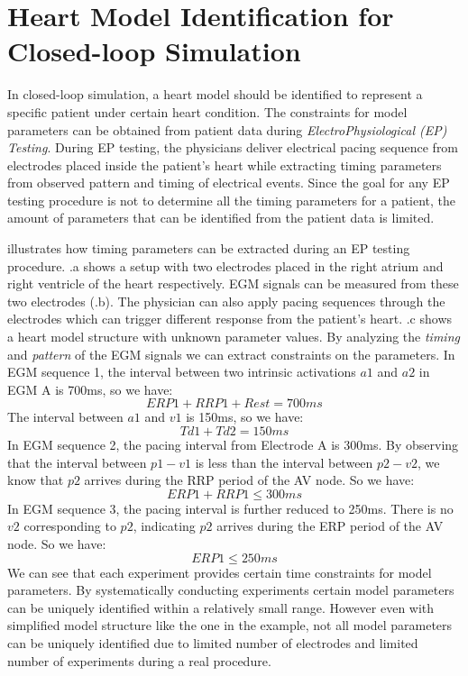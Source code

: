 \section{Heart Model Identification for Closed-loop Simulation}
In closed-loop simulation, a heart model should be identified to represent a specific patient under certain heart condition. The constraints for model parameters can be obtained from patient data during \emph{ElectroPhysiological (EP) Testing}. During EP testing, the physicians deliver electrical pacing sequence from electrodes placed inside the patient's heart while extracting timing parameters from observed pattern and timing of electrical events. Since the goal for any EP testing procedure is not to determine all the timing parameters for a patient, the amount of parameters that can be identified from the patient data is limited.    

 illustrates how timing parameters can be extracted during an EP testing procedure. .a shows a setup with two electrodes placed in the right atrium and right ventricle of the heart respectively. EGM signals can be measured from these two electrodes (.b). The physician can also apply pacing sequences through the electrodes which can trigger different response from the patient's heart. .c shows a heart model structure with unknown parameter values. By analyzing the \emph{timing} and \emph{pattern} of the EGM signals we can extract constraints on the parameters. In EGM sequence 1, the interval between two intrinsic activations $a1$ and $a2$ in EGM A is 700ms, so we have:
$$ERP1+RRP1+Rest=700ms$$
The interval between $a1$ and $v1$ is 150ms, so we have:
$$Td1+Td2=150ms$$
In EGM sequence 2, the pacing interval from Electrode A is 300ms. By observing that the interval between $p1-v1$ is less than the interval between $p2-v2$, we know that $p2$ arrives during the RRP period of the AV node. So we have:
$$ERP1+RRP1\leq 300ms$$
In EGM sequence 3, the pacing interval is further reduced to 250ms. There is no $v2$ corresponding to $p2$, indicating $p2$ arrives during the ERP period of the AV node. So we have:
$$ERP1\leq 250ms$$
We can see that each experiment provides certain time constraints for model parameters. By systematically conducting experiments certain model parameters can be uniquely identified within a relatively small range. However even with simplified model structure like the one in the example, not all model parameters can be uniquely identified due to limited number of electrodes and limited number of experiments during a real procedure.






